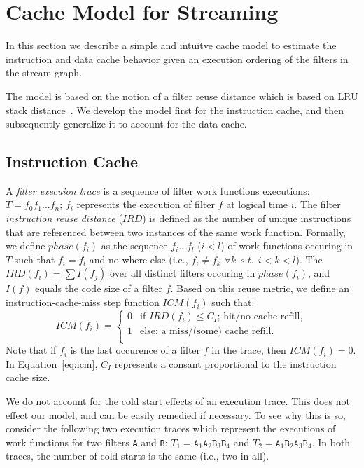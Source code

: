 \section{Cache Model for Streaming}
\label{sec:cache-model}

In this section we describe a simple and intuitve cache model to
estimate the instruction and data cache behavior given an execution
ordering of the filters in the stream graph.

The model is based on the notion of a filter reuse distance which is 
based on LRU stack distance~\cite{mattson-reuse}. We develop the model
first for the instruction cache, and then subsequently generalize it to
account for the data cache.

\subsection{Instruction Cache}

A {\it filter execuion trace} is a sequence of 
filter work functions executions: $T = f_0 f_1 ... f_n$; $f_i$ represents the
execution of filter $f$ at logical time $i$.
The filter {\it instruction reuse distance} ($IRD$) is defined as the
number of unique instructions that are referenced between two
instances of the same work function. Formally, we define $phase(f_i)$
as the sequence $f_i ... f_l$ ($i < l$) of work functions occuring in
$T$ such that $f_i = f_l$ and no where else (i.e., $f_i \neq f_k$
$\forall{k}~~s.t.~~i < k < l$). The $IRD(f_i) = \sum I(f_j)$ over all
distinct filters occuring in $phase(f_i)$, and $I(f)$ equals the code
size of a filter $f$. Based on this reuse metric, we define an
instruction-cache-miss step function $ICM(f_i)$ such that:
\begin{equation}
\label{eq:icm}
  ICM(f_i) =
    \begin{cases}
      0& \text{if $IRD(f_i) \leq C_I$; hit/no cache refill},\\
      1& \text{else; a miss/(some) cache refill}.\\
    \end{cases}
\end{equation}
Note that if $f_i$ is the last occurence of a filter $f$ in the trace,
then $ICM(f_i) = 0$. In Equation~\ref{eq:icm}, $C_I$ represents a
consant proportional to the instruction cache size.

We do not account for the cold start
effects of an execution trace. This does not effect our model, and can
be easily remedied if necessary. To see why this is so, consider the
following two execution traces which represent the executions of work
functions for two filters \texttt{A} and \texttt{B}:
$T_1 = \texttt{A}_1\texttt{A}_2\texttt{B}_3\texttt{B}_4$
and 
$T_2 = \texttt{A}_1\texttt{B}_2\texttt{A}_3\texttt{B}_4$.
In both 
traces, the number of cold starts is the same (i.e., two in all).

